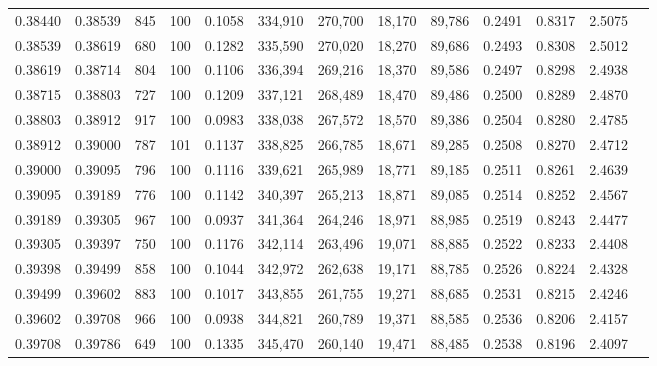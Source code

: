 \begin{tabular}{rrrrrrrrrrrrr}
0.38440 & 0.38539 &   845 & 100 &                                     0.1058 & 334,910 & 270,700 &  18,170 &  89,786 & 0.2491 & 0.8317 & 2.5075 \\
0.38539 & 0.38619 &   680 & 100 &                                     0.1282 & 335,590 & 270,020 &  18,270 &  89,686 & 0.2493 & 0.8308 & 2.5012 \\
0.38619 & 0.38714 &   804 & 100 &                                     0.1106 & 336,394 & 269,216 &  18,370 &  89,586 & 0.2497 & 0.8298 & 2.4938 \\
0.38715 & 0.38803 &   727 & 100 &                                     0.1209 & 337,121 & 268,489 &  18,470 &  89,486 & 0.2500 & 0.8289 & 2.4870 \\
0.38803 & 0.38912 &   917 & 100 &                                     0.0983 & 338,038 & 267,572 &  18,570 &  89,386 & 0.2504 & 0.8280 & 2.4785 \\
0.38912 & 0.39000 &   787 & 101 &                                     0.1137 & 338,825 & 266,785 &  18,671 &  89,285 & 0.2508 & 0.8270 & 2.4712 \\
0.39000 & 0.39095 &   796 & 100 &                                     0.1116 & 339,621 & 265,989 &  18,771 &  89,185 & 0.2511 & 0.8261 & 2.4639 \\
0.39095 & 0.39189 &   776 & 100 &                                     0.1142 & 340,397 & 265,213 &  18,871 &  89,085 & 0.2514 & 0.8252 & 2.4567 \\
0.39189 & 0.39305 &   967 & 100 &                                     0.0937 & 341,364 & 264,246 &  18,971 &  88,985 & 0.2519 & 0.8243 & 2.4477 \\
0.39305 & 0.39397 &   750 & 100 &                                     0.1176 & 342,114 & 263,496 &  19,071 &  88,885 & 0.2522 & 0.8233 & 2.4408 \\
0.39398 & 0.39499 &   858 & 100 &                                     0.1044 & 342,972 & 262,638 &  19,171 &  88,785 & 0.2526 & 0.8224 & 2.4328 \\
0.39499 & 0.39602 &   883 & 100 &                                     0.1017 & 343,855 & 261,755 &  19,271 &  88,685 & 0.2531 & 0.8215 & 2.4246 \\
0.39602 & 0.39708 &   966 & 100 &                                     0.0938 & 344,821 & 260,789 &  19,371 &  88,585 & 0.2536 & 0.8206 & 2.4157 \\
0.39708 & 0.39786 &   649 & 100 &                                     0.1335 & 345,470 & 260,140 &  19,471 &  88,485 & 0.2538 & 0.8196 & 2.4097 \\

\end{tabular}
